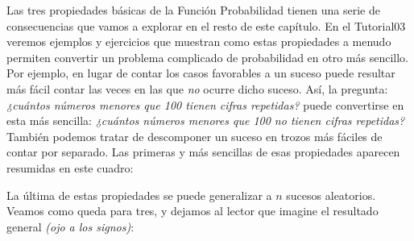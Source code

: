 Las tres propiedades básicas de la Función Probabilidad tienen una serie de consecuencias que vamos a explorar en el resto de este capítulo. En el Tutorial03 veremos ejemplos y ejercicios que muestran como estas propiedades a menudo permiten convertir un problema complicado de probabilidad en otro más sencillo. Por ejemplo, en lugar de contar los casos favorables a un suceso puede resultar más fácil contar las veces en las que {\em no} ocurre dicho suceso. Así, la pregunta: {\em ¿cuántos números menores que 100 tienen cifras repetidas?} puede convertirse en esta más sencilla: {\em ¿cuántos números menores que 100 no tienen cifras repetidas?} También podemos tratar de descomponer un suceso en trozos más fáciles de contar por separado. Las primeras y más sencillas de esas propiedades aparecen resumidas en este cuadro:	
    \begin{center}
    \end{center}
La última de estas propiedades se puede generalizar a $n$ sucesos aleatorios. Veamos como queda para tres, y dejamos al lector que imagine el resultado general {\em (ojo a los signos)}:
